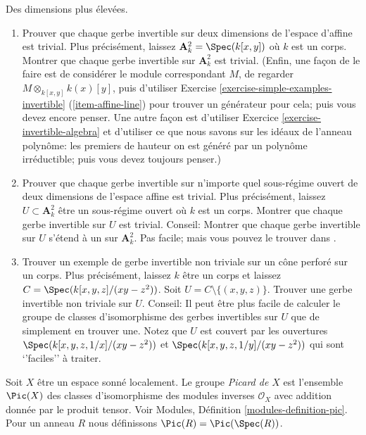 \begin{exercise}
\label{exercise-higher-dimension-invertible}
Des dimensions plus élevées.
\begin{enumerate}
\item Prouver que chaque gerbe invertible sur deux dimensions
de l'espace d'affine est trivial. Plus précisément,
laissez ${\mathbf A}^2_k = \Spec(k[x, y])$ où $k$
est un corps. Montrer que chaque gerbe invertible sur ${\mathbf
A}^2_k$ est trivial. (Enfin, une façon de le faire
est de considérer le module correspondant $M$, de regarder
$M
\otimes_{k[x, y]} k(x)[y]$, puis d'utiliser Exercise \ref{exercise-simple-examples-invertible} (\ref{item-affine-line}) pour trouver un générateur
pour cela; puis vous devez encore penser. Une autre
façon est d'utiliser
Exercice \ref{exercise-invertible-algebra} et d'utiliser ce que nous
savons sur les idéaux de l'anneau
polynôme: les premiers de hauteur on est généré par un polynôme
irréductible; puis vous devez toujours penser.)
\item Prouver que chaque gerbe invertible sur n'importe quel
sous-régime ouvert de deux dimensions de l'espace affine est trivial. Plus précisément, laissez $U
\subset {\mathbf A}^2_k$ être un sous-régime ouvert où $k$ est un corps.
Montrer que chaque gerbe invertible sur $U$ est trivial. Conseil: Montrer que chaque
gerbe invertible sur $U$ s'étend à un sur ${\mathbf A}^2_k$. Pas facile; mais
vous pouvez le trouver dans \cite{H}.
\item Trouver un exemple de gerbe invertible
non triviale sur un cône perforé sur un corps. Plus
précisément, laissez $k$ être un corps et laissez $C = \Spec(k[x, y, z]/(xy-z^2))$. Soit
$U = C \setminus \{ (x, y, z) \}$. Trouver
une gerbe invertible non triviale sur $U$. Conseil: Il peut être plus
facile de calculer le groupe de classes d'isomorphisme des gerbes invertibles sur
$U$ que de simplement en trouver une. Notez que $U$
est couvert par les ouvertures $\Spec(k[x, y,
z, 1/x]/(xy-z^2))$ et $\Spec(k[x, y, z,
1/y]/(xy-z^2))$ qui sont `'faciles'' à traiter.
\end{enumerate}
\end{exercise}

\begin{definition}
\label{definition-picard-group}
Soit $X$ être un espace
sonné localement. Le groupe {\it Picard de $X$}
est l'ensemble $\Pic(X)$ des classes d'isomorphisme des modules inverses
$\mathcal{O}_X$ avec addition donnée par le
produit tensor. Voir Modules, Définition \ref{modules-definition-pic}. Pour un
anneau $R$ nous définissons $\Pic(R) = \Pic(\Spec(R))$.
\end{definition}


